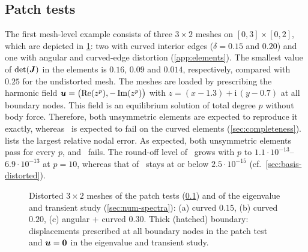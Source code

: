 \subsection{Patch tests}
\label{sec:num-patch}
%
The first mesh-level example consists of three $3\times2$ meshes on $[0,3]\times[0,2]$, which are depicted in \cref{fig:mesh32}: two with curved interior edges ($\delta=0.15$ and $0.20$) and one with angular and curved-edge distortion (\cref{app:elements}). The smallest value of $\det(\bm{J})$ in the elements is $0.16$, $0.09$ and $0.014$, respectively, compared with $0.25$ for the undistorted mesh. The meshes are loaded by prescribing the harmonic field $\bm{u}=\bigl(\operatorname{Re}(z^p),-\operatorname{Im}(z^p)\bigr)$ with $z=(x-1.3)+\mathrm i\,(y-0.7)$ at all boundary nodes. This field is an equilibrium solution of total degree $p$ without body force. Therefore, both unsymmetric elements are expected to reproduce it exactly, whereas \PP\ is expected to fail on the curved elements (\cref{sec:completeness}).  lists the largest relative nodal error. As expected, both unsymmetric elements pass for every $p$, and \PP\ fails. The round-off level of \PM\ grows with $p$ to $1.1\cdot10^{-13}$--$6.9\cdot10^{-13}$ at $p=10$, whereas that of \PH\ stays at or below $2.5\cdot10^{-15}$ (cf.\ \cref{sec:basis-distorted}).

\begin{figure}[htbp]
  \centering
  
  \caption{Distorted $3\times2$ meshes of the patch tests (\cref{sec:num-patch}) and of the eigenvalue and transient study (\cref{sec:num-spectra}): (a) curved $0.15$, (b) curved $0.20$, (c) angular + curved $0.30$. Thick (hatched) boundary: displacements prescribed at all boundary nodes in the patch test and $\bm{u}=\bm{0}$ in the eigenvalue and transient study.}
  \label{fig:mesh32}
\end{figure}

\begin{table}[htbp]
  \centering\small
  \caption{Patch test of degree $p$ on the distorted $3\times2$ meshes: largest relative nodal error.}
  \label{tab:patch}
  
\end{table}

